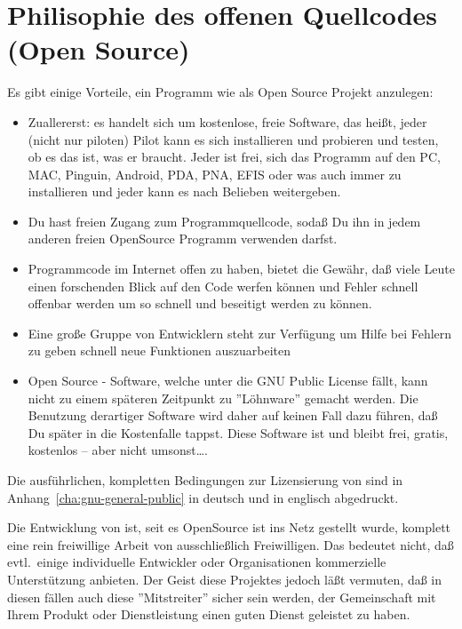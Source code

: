 \section{Philisophie des offenen Quellcodes (Open Source)}

Es gibt einige Vorteile, ein Programm wie \xc als Open Source Projekt anzulegen:

\begin{itemize}
\item Zuallererst: es handelt sich um kostenlose, freie Software, das heißt, jeder (nicht nur piloten) Pilot kann es sich installieren und probieren und testen,
ob es das ist, was er braucht. Jeder ist frei, sich das Programm auf den PC, MAC, Pinguin, Android, PDA, PNA, EFIS  oder was auch immer zu installieren
und jeder kann es nach Belieben weitergeben.

\item Du hast freien Zugang zum Programmquellcode, sodaß Du ihn in jedem anderen freien OpenSource Programm verwenden darfst.

\item Programmcode im Internet offen zu haben, bietet die Gewähr, daß viele Leute einen forschenden Blick auf den Code werfen können und Fehler schnell offenbar
werden um so schnell und beseitigt werden zu können.

\item  Eine große Gruppe von Entwicklern steht zur Verfügung um Hilfe bei Fehlern zu geben schnell neue Funktionen auszuarbeiten

\item Open Source - Software, welche unter die GNU Public License fällt, kann nicht zu einem späteren Zeitpunkt zu ''Löhnware''
gemacht werden. Die Benutzung derartiger Software wird daher auf keinen Fall dazu führen, daß Du später in die Kostenfalle tappst.
Diese Software ist und bleibt frei, gratis, kostenlos -- aber nicht umsonst\dots.

\end{itemize}

Die ausführlichen, kompletten Bedingungen zur Lizensierung von \xc sind in Anhang~\ref{cha:gnu-general-public} in deutsch und in englisch abgedruckt.

Die Entwicklung von \xc ist, seit es OpenSource ist ins Netz gestellt wurde, komplett eine rein freiwillige Arbeit von ausschließlich Freiwilligen.
Das bedeutet nicht, daß evtl.\  einige individuelle Entwickler oder Organisationen  kommerzielle Unterstützung anbieten.
Der Geist diese Projektes jedoch läßt vermuten, daß in diesen fällen auch diese  ''Mitstreiter'' sicher sein werden, der Gemeinschaft
mit Ihrem Produkt oder Dienstleistung einen guten Dienst geleistet zu haben.

